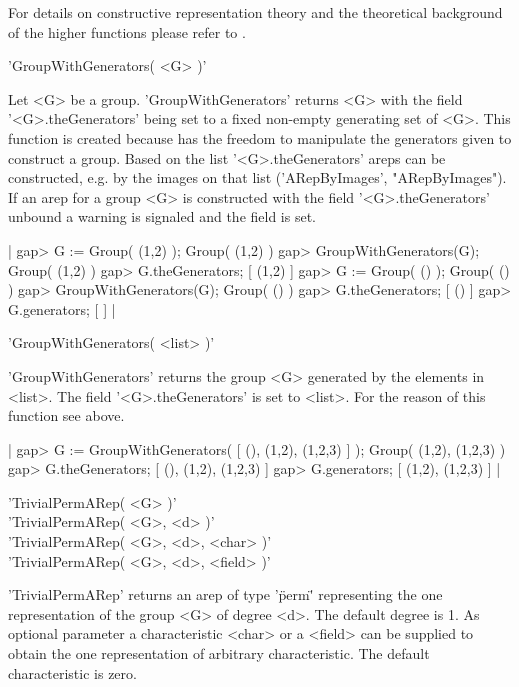 For details on constructive representation theory and the theoretical
background of the higher functions please refer to \cite{Pue99}.


'GroupWithGenerators( <G> )'

Let <G> be a group. 'GroupWithGenerators' returns <G> with the 
field '<G>.theGenerators' being set to a fixed non-empty generating
set of <G>. This function is created because {\GAP} has the freedom 
to manipulate the generators given to construct a group.
Based on the list '<G>.theGenerators' areps can be 
constructed, e.g. by the images on that list 
('ARepByImages', "ARepByImages"). If an arep for a group <G> 
is constructed with the field '<G>.theGenerators' unbound a
warning is signaled and the field is set.

|    gap> G := Group( (1,2) );
    Group( (1,2) )
    gap> GroupWithGenerators(G);
    Group( (1,2) )
    gap> G.theGenerators;
    [ (1,2) ]
    gap> G := Group( () );
    Group( () )
    gap> GroupWithGenerators(G);
    Group( () )
    gap> G.theGenerators;
    [ () ]
    gap> G.generators;
    [  ] |

'GroupWithGenerators( <list> )'

'GroupWithGenerators' returns the group <G> generated by the elements
in <list>. The field '<G>.theGenerators' is set to <list>. 
For the reason of this function see above.

|    gap> G := GroupWithGenerators( [ (), (1,2), (1,2,3) ] );
    Group( (1,2), (1,2,3) )
    gap> G.theGenerators;
    [ (), (1,2), (1,2,3) ]
    gap> G.generators;
    [ (1,2), (1,2,3) ] |


'TrivialPermARep( <G> )'\\
'TrivialPermARep( <G>, <d> )'\\
'TrivialPermARep( <G>, <d>, <char> )'\\
'TrivialPermARep( <G>, <d>, <field> )'

'TrivialPermARep' returns an arep of type '\"perm\"' representing 
the one representation of the group <G> of degree <d>. The default
degree is 1.
As optional parameter a characteristic <char> or a <field> 
can be supplied to obtain the one representation of arbitrary 
characteristic. The default characteristic is zero.

